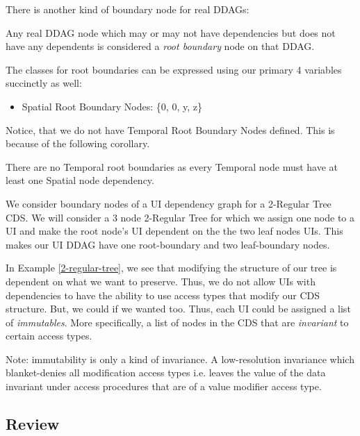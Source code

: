 There is another kind of boundary node for real DDAGs:

\begin{con-def}
	\label{root-boundaries}
	Any real DDAG node which may or may not have dependencies but does not have any dependents is considered a \textit{root boundary} node on that DDAG.
\end{con-def}

The classes for root boundaries can be expressed using our primary 4 variables succinctly as well:

\begin{itemize}
	\item Spatial Root Boundary Nodes: \{0, 0, y, z\}
\end{itemize}

Notice, that we do not have Temporal Root Boundary Nodes defined. This is because of the following corollary.

\begin{con-cor}
	\label{no-temp-root-bounds}
	There are no Temporal root boundaries as every Temporal node must have at least one Spatial node dependency.
\end{con-cor}

\begin{con-ex} 
	\label{2-regular-tree}
	We consider boundary nodes of a UI dependency graph for a 2-Regular Tree CDS. We will consider a 3 node 2-Regular Tree for which we assign one node to a UI and make the root node's UI dependent on the the two leaf nodes UIs. This makes our UI DDAG have one root-boundary and two leaf-boundary nodes.
\end{con-ex}

In Example \ref{2-regular-tree}, we see that modifying the structure of our tree is dependent on what we want to preserve. Thus, we do not allow UIs with dependencies to have the ability to use access types that modify our CDS structure. But, we could if we wanted too. Thus, each UI could be assigned a list of \textit{immutables}. More specifically, a list of nodes in the CDS that are \textit{invariant} to certain access types.

Note: immutability is only a kind of invariance. A low-resolution invariance which blanket-denies all modification access types i.e. leaves the value of the data invariant under access procedures that are of a value modifier access type.

\subsection{Review}


